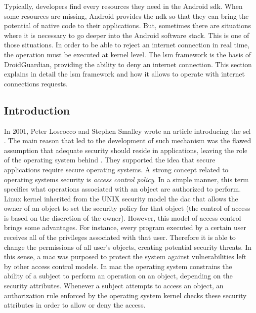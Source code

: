 Typically, developers find every resources they need in the Android \gls{sdk}. When some resources are missing, Android provides the \gls{ndk} so that they can bring the potential of native code to their applications. But, sometimes there are situations where it is necessary to go deeper into the Android software stack. This is one of those situations. In order to be able to reject an internet connection in real time, the operation must be executed at kernel level. The \gls{lsm} framework is the basis of DroidGuardian, providing the ability to deny an internet connection. This section explains in detail the \gls{lsm} framework and how it allows to operate with internet connections requests.

\subsection{Introduction}

In 2001, Peter Loscocco and Stephen Smalley wrote an article introducing the \gls{sel} \cite{LS01}. The main reason that led to the development of such mechanism was the flawed assumption that adequate security should reside in applications, leaving the role of the operating system behind \cite{LSMTTF98}. They supported the idea that secure applications require secure operating systems. A strong concept related to operating systems security is \textit{access control policy}. In a simple manner, this term specifies what operations associated with an object are authorized to perform. Linux kernel inherited from the UNIX security model the \gls{dac} that allows the owner of an object to set the security policy for that object (the control of access is based on the discretion of the owner). However, this model of access control brings some advantages. For instance, every program executed by a certain user receives all of the privileges associated with that user. Therefore it is able to change the permissions of all user's objects, creating potential security threats. In this sense, a \gls{mac} was purposed to protect the system against vulnerabilities left by other access control models. In \gls{mac} the operating system constrains the ability of a subject to perform an operation on an object, depending on the security attributes. Whenever a subject attempts to access an object, an authorization rule enforced by the operating system kernel checks these security attributes in order to allow or deny the access.

